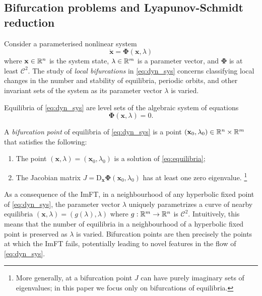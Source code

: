 \documentclass[letterpaper, 10 pt, conference, dvipsnames]{ieeeconf}
\begin{document}
\subsection{Bifurcation problems and Lyapunov-Schmidt reduction}

Consider a parameterised nonlinear system
\begin{equation}
    \dot{\mathbf{x}} = \boldsymbol{\Phi}(\mathbf{x},\lambda) \label{eq:dyn_sys}
\end{equation}
where \(\mathbf{x} \in \R[n]\) is the system state, {\(\lambda \in \R[m]\) is a parameter vector}, and \({\boldsymbol{\Phi}}\) is at least {\(\mathcal{C}^{2}\)}. The study of \textit{local bifurcations} in \eqref{eq:dyn_sys} concerns classifying local changes in the number and stability of equilibria, periodic orbits, and other invariant sets of the system as its {parameter vector \(\lambda\)} is varied.

Equilibria of \eqref{eq:dyn_sys} are level sets of the algebraic system of equations
\begin{equation}
    \boldsymbol{\Phi}(\mathbf{x},\lambda) = 0. \label{eq:equilibria}
\end{equation}

A \textit{bifurcation} \textit{point} of equilibria of \eqref{eq:dyn_sys} is a point \((\mathbf{x}_0,\lambda_0)\in\R[n]\times\R[m]\) that satisfies the following:
\begin{enumerate}
    \item The point \((\mathbf{x},\lambda) = (\mathbf{x}_0,\lambda_0)\) is a solution of \eqref{eq:equilibria};
    \item The Jacobian matrix \(J = \mathrm{D}_{\mathbf{x}}{\boldsymbol{\Phi}}(\mathbf{x}_0,\lambda_0)\) has at least one {zero} eigenvalue. \footnote{More generally, at a bifurcation point \(J\) can have purely imaginary sets of eigenvalues; in this paper we focus only on bifurcations of equilibria.}
\end{enumerate}

As a consequence of the ImFT, in a neighbourhood of any hyperbolic fixed point of \eqref{eq:dyn_sys}, the parameter vector \(\lambda\) uniquely parametrizes a curve of nearby equilibria \((\mathbf{x},\lambda) = (g(\lambda),\lambda)\) where  \(g:\R[m]\to\R[n]\) is \(\mathcal{C}^2\). Intuitively, this means that the number of equilibria in a neighbourhood of a hyperbolic fixed point is preserved as \(\lambda\) is varied. Bifurcation points are then precisely the points at which the ImFT fails, potentially leading to novel features in the flow of  \eqref{eq:dyn_sys}.
\end{document}
